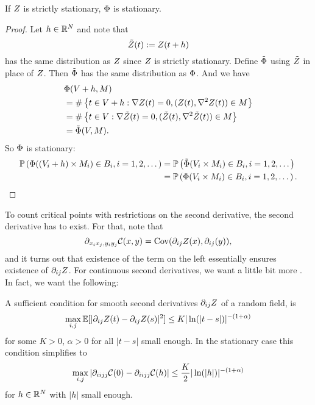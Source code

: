 \begin{lemma}[Stationarity]
	If \(Z\) is strictly stationary, \(\Phi\) is stationary.
\end{lemma}
\begin{proof}
	Let \(h\in \mathbb{R}^N\) and note that
	\[
		\tilde{Z}(t) := Z(t+h)
	\]
	has the same distribution as \(Z\) since \(Z\) is strictly stationary. Define
	\(\tilde{\Phi}\) using \(\tilde{Z}\) in place of \(Z\). Then
	\(\tilde{\Phi}\) has the same distribution as \(\Phi\).
	And we have
	\begin{align*}
		&\Phi(V+h, M)\\
		&= \#\left\{t\in V+h:
			\nabla Z(t)=0,
			(Z(t),\nabla^2Z(t))\in M
		\right\}\\
		&= \#\left\{t\in V:
			\nabla\tilde{Z}(t)=0,
			(\tilde{Z}(t),\nabla^2\tilde{Z}(t))\in M
		\right\}\\
		&= \tilde{\Phi}(V, M).
	\end{align*}
	So \(\Phi\) is stationary:
	\begin{align*}
		\mathbb{P}\left(\Phi((V_i+h)\times M_i)\in B_i, i=1,2,\dots\right)
		&= \mathbb{P}\left(\tilde{\Phi}(V_i\times M_i)\in B_i, i=1,2,\dots\right)\\
		&= \mathbb{P}\left(\Phi(V_i\times M_i)\in B_i, i=1,2,\dots\right).
		\qedhere
	\end{align*}
\end{proof}

To count critical points with restrictions on the second derivative, the second
derivative has to exist. For that, note that
\[
	\partial_{x_i x_j, y_i y_j}\mathcal{C}(x,y) = \operatorname{Cov}(\partial_{ij}Z(x), \partial_{ij}(y)),
\]
and it turns out that existence of the term on the left essentially ensures
existence of \(\partial_{ij}Z\). For continuous second
derivatives, we want a little bit more \parencite[cf.
Theorem~1.4.1]{adlerRandomFieldsGeometry2007}. In fact, we want the following:

\begin{assumption}\label{assmpt: smoothness assumption}
	A sufficient condition for smooth second derivatives \(\partial_{ij}	Z\)
	of a random field, is
	\begin{equation}\label{eq: sufficient for continuous second derivative}
		\max_{i,j}\mathbb{E}[|\partial_{ij}Z(t) - \partial_{ij}Z(s)|^2]
		\le K |\ln(|t-s|)|^{-(1+\alpha)}
	\end{equation}
	for some \(K>0\), \(\alpha>0\) for all \(|t-s|\) small enough.
	In the stationary case this condition simplifies to
	\[
		\max_{i,j}|\partial_{ii jj}\mathcal{C}(0)
		-\partial_{ii jj}\mathcal{C}(h)| \le \frac{K}2 |\ln(|h|)|^{-(1+\alpha)}
	\]
	for \(h\in\mathbb{R}^N\) with \(|h|\) small enough.
\end{assumption}



